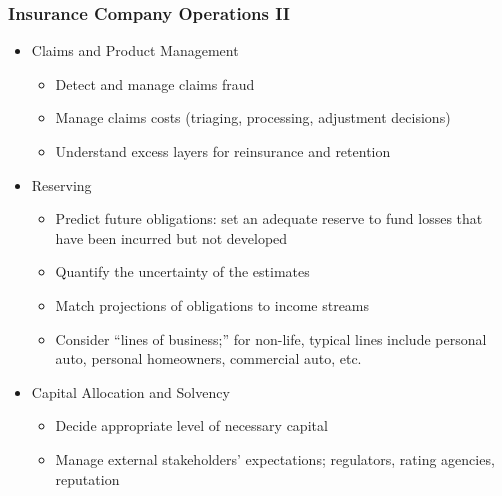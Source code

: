 \documentclass[serif,10pt]{beamer}
\begin{document}
\begin{frame}%
\frametitle{Insurance Company Operations II}
 \begin{itemize}
 \item Claims and Product Management \vspace{2mm}
 \begin{itemize}
  \item Detect and manage claims fraud \vspace{2mm}
 \item Manage claims costs (triaging, processing, adjustment decisions) \vspace{2mm}
 \item Understand excess layers for reinsurance and retention \vspace{2mm}
\end{itemize}
\item Reserving \vspace{2mm}
 \begin{itemize}
 \item Predict future obligations: set an adequate reserve to fund losses that have been incurred but not developed \vspace{2mm}
\item Quantify the uncertainty of the estimates \vspace{2mm}
\item Match projections of obligations to income streams \vspace{2mm}
\item Consider ``lines of business;'' for non-life, typical lines
include personal auto, personal homeowners, commercial auto, etc.
\vspace{2mm}
\end{itemize}
\item Capital Allocation and Solvency \vspace{2mm}
 \begin{itemize}
\item Decide appropriate level of necessary capital \vspace{2mm}
\item Manage external stakeholders' expectations; regulators, rating agencies, reputation
\end{itemize}
\end{itemize}
\end{frame}
\end{document}
